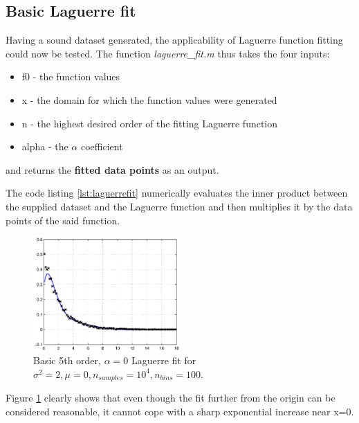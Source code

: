 \documentclass[a4paper]{article}
\numberwithin{equation}{section}
\begin{document}
\subsection{Basic Laguerre fit}
Having a sound dataset generated, the applicability of Laguerre function fitting could now be tested. The function \textit{laguerre\_fit.m} thus takes the four inputs:
\begin{itemize}
\item f0 - the function values
\item x - the domain for which the function values were generated
\item n - the highest desired order of the fitting Laguerre function
\item alpha - the $\alpha$ coefficient
\end{itemize}
and returns the \textbf{fitted data points} as an output.



\noindent The code listing \ref{lst:laguerrefit} numerically evaluates the inner product between the supplied dataset and the Laguerre function and then multiplies it by the data points of the said function.

\begin{figure}
\centering
\includegraphics[width=0.5\textwidth]{basic_fit.eps}
\caption{\label{fig:basicfit}Basic 5th order, $\alpha=0$ Laguerre fit for $\sigma^2=2, \mu=0, n_{samples}=10^4, n_{bins}=100$.}
\end{figure}

\noindent Figure \ref{fig:basicfit} clearly shows that even though the fit further from the origin can be considered reasonable, it cannot cope with a sharp exponential increase near x=0.
\end{document}
